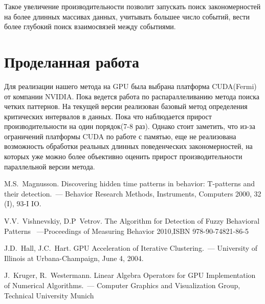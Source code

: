 \documentclass[12pt]{article}
\begin{document}
Такое увеличение производительности позволит запускать поиск закономерностей 
на более длинных массивах данных, учитывать большее число событий, вести более
глубокий поиск взаимосвязей между событиями.
\section{Проделанная работа}
Для реализации нашего метода на GPU была выбрана платформа CUDA(Fermi) от 
компании NVIDIA. Пока ведется работа по распараллеливанию метода поиска 
четких паттернов. На текущей версии реализован базовый метод определения
критических интервалов в данных. Пока что наблюдается прирост производительности на один
порядок(7-8 раз). Однако стоит заметить, что из-за ограничений платформы 
CUDA по работе с памятью, еще не реализована возможность обработки реальных
длинных поведенческих закономерностей, на которых уже можно более объективно
оценить прирост производительности параллельной версии метода.

\newpage
\begin{thebibliography}{00}
M.S.~Magnusson. Discovering hidden time patterns in behavior:
T-patterns and their detection.~--- Behavior Research Methods, Instruments, Computers
2000, 32 (I), 93-I IO.

V.V.~Vishnevskiy, D.P~Vetrov. The Algorithm for Detection of Fuzzy Behavioral Patterns
~---Proceedings of Measuring Behavior 2010,ISBN 978-90-74821-86-5 

J.D.~Hall, J.C.~Hart. GPU Acceleration of Iterative Clustering.~---
University of Illinois at Urbana-Champaign, June 4, 2004.

J.~Kruger, R.~Westermann.
Linear Algebra Operators
for GPU Implementation of Numerical Algorithms.~---
Computer Graphics and Visualization Group, Technical University Munich
\end{thebibliography}
\end{document}
